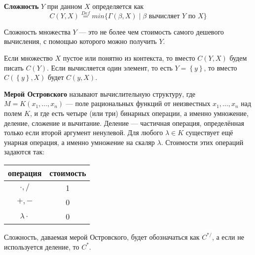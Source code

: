 \begin{definition}
  \textbf{Сложность} $Y$ при данном $X$ определяется как
  \[
  	C(Y,X) \overset{Def}{=} min \{ \Gamma(\beta,X) \mid \beta \mbox{ вычисляет } Y \mbox{ по } X \}
  \]
\end{definition}
Сложность множества $Y$ --- это не более чем стоимость самого дешевого вычисления, с помощью которого можно получить $Y$. 

Если множество $X$ пустое или понятно из контекста, то вместо $C(Y,X)$ будем писать $C(Y)$. Если вычисляется один элемент, то есть $Y = \left\{ y \right\}$, то вместо $C(\left\{ y \right\},X)$ будет $C(y,X)$.

\textbf{Мерой Островского} называют вычислительную структуру, где $M = K(x_1, \ldots , x_n)$ --- поле рациональных функций от неизвестных $x_1, \ldots , x_n$ над полем $K$, и где есть четыре (или три) бинарных операции, а именно умножение, деление, сложение и вычитание. Деление --- частичная операция, определённая только если второй аргумент ненулевой. Для любого $\lambda \in K$ существует ещё унарная операция, а именно умножение на скаляр $\lambda$. Стоимости этих операций задаются так:
\begin{center}
  \begin{tabular}{c|c}
	  операция  & стоимость   \\
	  \hline
	  $\cdot,/$ & 1 \\
	  $+,-$ & 0 \\
	  $\lambda \cdot$ & 0
  \end{tabular}
\end{center}

Сложность, даваемая мерой Островского, будет обозначаться как $C^{*/}$, а если не используется деление, то $C^{*}$.


